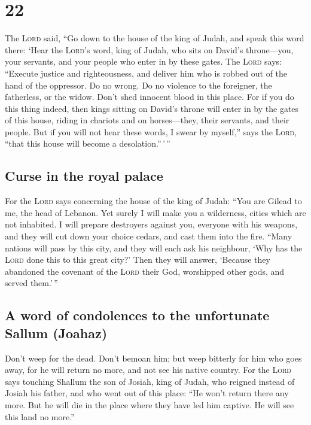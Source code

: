 \hypertarget{section-21}{%
\section{22}\label{section-21}}

 The \textsc{Lord} said, ``Go down to the house of the
king of Judah, and speak this word there:  `Hear the
\textsc{Lord}'s word, king of Judah, who sits on David's throne---you,
your servants, and your people who enter in by these gates.
 The \textsc{Lord} says: ``Execute justice and
righteousness, and deliver him who is robbed out of the hand of the
oppressor. Do no wrong. Do no violence to the foreigner, the fatherless,
or the widow. Don't shed innocent blood in this place. 
For if you do this thing indeed, then kings sitting on David's throne
will enter in by the gates of this house, riding in chariots and on
horses---they, their servants, and their people.  But if
you will not hear these words, I swear by myself,'' says the
\textsc{Lord}, ``that this house will become a desolation.''\,'\,''

\hypertarget{curse-in-the-royal-palace}{%
\subsection{Curse in the royal palace}\label{curse-in-the-royal-palace}}

 For the \textsc{Lord} says concerning the house of the
king of Judah: ``You are Gilead to me, the head of Lebanon. Yet surely I
will make you a wilderness, cities which are not inhabited.
 I will prepare destroyers against you, everyone with his
weapons, and they will cut down your choice cedars, and cast them into
the fire.  ``Many nations will pass by this city, and they
will each ask his neighbour, `Why has the \textsc{Lord} done this to
this great city?'  Then they will answer, `Because they
abandoned the covenant of the \textsc{Lord} their God, worshipped other
gods, and served them.'\,''

\hypertarget{a-word-of-condolences-to-the-unfortunate-sallum-joahaz}{%
\subsection{A word of condolences to the unfortunate Sallum
(Joahaz)}\label{a-word-of-condolences-to-the-unfortunate-sallum-joahaz}}

 Don't weep for the dead. Don't bemoan him; but weep
bitterly for him who goes away, for he will return no more, and not see
his native country.  For the \textsc{Lord} says touching
Shallum the son of Josiah, king of Judah, who reigned instead of Josiah
his father, and who went out of this place: ``He won't return there any
more.  But he will die in the place where they have led
him captive. He will see this land no more.''


